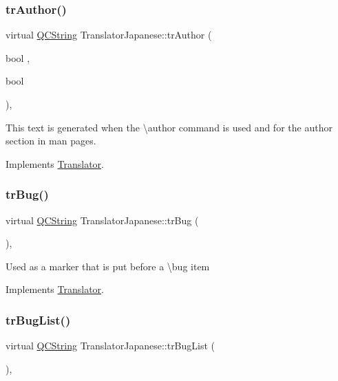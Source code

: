 \subsubsection{\texorpdfstring{trAuthor()}{trAuthor()}}
{\footnotesize\ttfamily virtual \mbox{\hyperlink{class_q_c_string}{Q\+C\+String}} Translator\+Japanese\+::tr\+Author (\begin{DoxyParamCaption}\item[{bool}]{,  }\item[{bool}]{ }\end{DoxyParamCaption})\hspace{0.3cm}{\ttfamily [inline]}, {\ttfamily [virtual]}}

This text is generated when the \textbackslash{}author command is used and for the author section in man pages. 

Implements \mbox{\hyperlink{class_translator}{Translator}}.

\mbox{\label{class_translator_japanese_aefc77d8dc5d731929a925a885f2167ea}} 
\subsubsection{\texorpdfstring{trBug()}{trBug()}}
{\footnotesize\ttfamily virtual \mbox{\hyperlink{class_q_c_string}{Q\+C\+String}} Translator\+Japanese\+::tr\+Bug (\begin{DoxyParamCaption}{ }\end{DoxyParamCaption})\hspace{0.3cm}{\ttfamily [inline]}, {\ttfamily [virtual]}}

Used as a marker that is put before a \textbackslash{}bug item 

Implements \mbox{\hyperlink{class_translator}{Translator}}.

\mbox{\label{class_translator_japanese_a75db1decf69567f638257057f071dd16}} 
\subsubsection{\texorpdfstring{trBugList()}{trBugList()}}
{\footnotesize\ttfamily virtual \mbox{\hyperlink{class_q_c_string}{Q\+C\+String}} Translator\+Japanese\+::tr\+Bug\+List (\begin{DoxyParamCaption}{ }\end{DoxyParamCaption})\hspace{0.3cm}{\ttfamily [inline]}, {\ttfamily [virtual]}}

